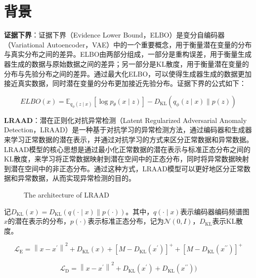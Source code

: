 \documentclass{article}
\begin{document}
\section{背景}

\textbf{证据下界}：证据下界（Evidence Lower Bound，ELBO）是变分自编码器（Variational Autoencoder，VAE）中的一个重要概念，用于衡量潜在变量的分布与真实分布之间的差异。ELBO由两部分组成，一部分是重构误差，用于衡量生成器生成的数据与原始数据之间的差异；另一部分是KL散度，用于衡量潜在变量的分布与先验分布之间的差异。通过最大化ELBO，可以使得生成器生成的数据更加接近真实数据，同时潜在变量的分布更加接近先验分布。证据下界的公式如下：

\begin{equation}
  ELBO(x)=\mathbb{E}_{q_{\phi}(z \mid x)}[\log p_{\theta}(x \mid z)]-D_{\mathrm{KL}}\left(q_{\phi}(z \mid x) \| p(z)\right) 
\end{equation}

\textbf{LRAAD}：潜在正则化对抗异常检测（Latent Regularized Adversarial Anomaly Detection，LRAAD）是一种基于对抗学习的异常检测方法，通过编码器和生成器来学习正常数据的潜在表示，并通过对抗学习的方式来区分正常数据和异常数据。LRAAD模型的核心思想是通过最小化正常数据的潜在表示与标准正态分布之间的KL散度，来学习将正常数据映射到潜在空间中的正态分布，同时将异常数据映射到潜在空间中的非正态分布。通过这种方式，LRAAD模型可以更好地区分正常数据和异常数据，从而实现异常检测的目的。

\begin{figure}[H]
    \centering
    \def\svgwidth{\textwidth}
    
    \caption{The architecture of LRAAD}
    \label{fig:lraad}
\end{figure}

记$D_{\mathrm{KL}}(x) = D_{\mathrm{KL}}(q(\cdot \mid x) \| p(\cdot))$。其中，$q(\cdot \mid x)$表示编码器编码频谱图$x$的潜在表示的分布，$p(\cdot)$表示标准正态分布，记为$\mathcal{N}(0, I)$，$D_{\mathrm{KL}}$表示KL散度。


\begin{equation}
  \mathcal{L}_{\mathrm{E}}=\left\|x-x^{\prime}\right\|^2 + D_{\mathrm{KL}}(x) + [M - D_{\mathrm{KL}}(x^\prime)]^{+} + [M - D_{\mathrm{KL}}(x^{\prime\prime})]^{+}
\end{equation}

\begin{equation}
  \mathcal{L}_{\text {D}}= \left\|x-x^{\prime}\right\|^2 + D_\mathrm{KL}(x^\prime) + D_\mathrm{KL}(x^{\prime\prime}))
\end{equation}
\end{document}
